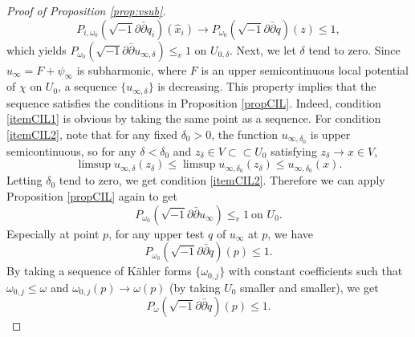 \documentclass[10pt,a4paper]{amsart}
\numberwithin{equation}{section}
\newcommand{\delb}{\sqrt{-1}\partial\bar{\partial}}
\begin{document}
\begin{proof}[Proof of Proposition \ref{prop:vsub}]
    $$P_{i,\omega_0}(\delb q_i)(\hat{x}_i) \rightarrow P_{\omega_0}(\delb q)(z) \le 1,$$
    which yields $P_{\omega_0}(\delb u_{\infty,\delta})\le_v 1$ on $U_{0,\delta}$.
    Next, we let $\delta$ tend to zero. Since $u_\infty = F + \psi_\infty$ is subharmonic, where $F$ is an upper semicontinuous local potential of $\chi$ on $U_0$, a sequence $\{ u_{\infty,\delta} \}$ is decreasing. This property implies that the sequence satisfies the conditions in Proposition \ref{propCIL}. 
    Indeed, condition \ref{itemCIL1} is obvious by taking the same point as a sequence. For condition \ref{itemCIL2}, note that for any fixed $\delta_0>0$, the function $u_{\infty,\delta_0}$ is upper semicontinuous, so for any $\delta < \delta_0$ and $z_\delta \in V \subset\subset U_0$ satisfying $z_\delta \rightarrow x \in V$,
    $$\limsup{u_{\infty,\delta}}(z_\delta)\le \limsup{u_{\infty,\delta_0}}(z_\delta) \le u_{\infty,\delta_0}(x).$$
    Letting $\delta_0$ tend to zero, we get condition \ref{itemCIL2}. Therefore we can apply Proposition \ref{propCIL} again to get
    $$P_{\omega_0}(\delb u_\infty) \le_v 1 \ \text{on $U_0$}.$$
    Especially at point $p$, for any upper test $q$ of $u_\infty$ at $p$, we have
    $$P_{\omega_0}(\delb q)(p) \le 1.$$
    By taking a sequence of K{\"a}hler forms $\{\omega_{0,j}\}$ with constant coefficients such that $\omega_{0,j} \le \omega$ and $\omega_{0,j}(p) \rightarrow \omega(p)$ (by taking $U_0$ smaller and smaller), we get
    $$P_\omega(\delb q)(p) \le 1.$$
    

\end{proof}
\end{document}
